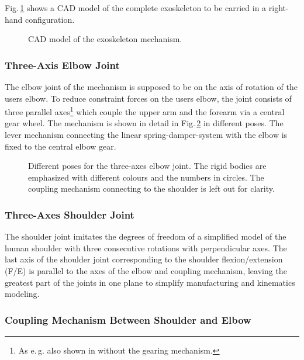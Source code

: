 \documentclass[letterpaper, 10 pt, conference]{ieeeconf}  %
\begin{document}
Fig.\,\ref{fig:KAS5_CAD} shows a CAD model of the complete exoskeleton to be carried in a right-hand configuration.


\begin{figure}[tb!]
    
    \caption{CAD model of the exoskeleton mechanism.}
    \label{fig:KAS5_CAD}
\end{figure} 

\subsubsection{Three-Axis Elbow Joint}

The elbow joint of the mechanism is supposed to be on the axis of rotation of the users elbow.
To reduce constraint forces on the users elbow, the joint consists of three parallel axes\footnote{As e.\,g. also shown in \cite{Pons2008} without the gearing mechanism.} which couple the upper arm and the forearm via a central gear wheel. The mechanism is shown in detail in Fig.\,\ref{fig:EllenbogenSimMech} in different poses.
The lever mechanism connecting the linear spring-damper-system with the elbow is fixed to the central elbow gear.

\begin{figure}[tb!]
    \small
    
    \caption{Different poses for the three-axes elbow joint. The rigid bodies are emphasized with different colours and the numbers in circles. The coupling mechanism connecting to the shoulder is left out for clarity.}
    \label{fig:EllenbogenSimMech}
\end{figure} 

\subsubsection{Three-Axes Shoulder Joint}

The shoulder joint imitates the degrees of freedom of a simplified model of the human shoulder with three consecutive rotations with perpendicular axes.
The last axis of the shoulder joint corresponding to the shoulder flexion/extension (F/E) is parallel to the axes of the elbow and coupling mechanism, leaving the greatest part of the joints in one plane to simplify manufacturing and kinematics modeling.

\subsubsection{Coupling Mechanism Between Shoulder and Elbow}
\end{document}
